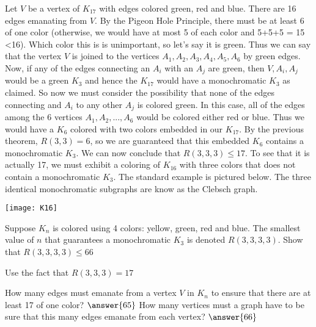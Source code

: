 \documentclass[handout]{ximera}
\begin{document}
\begin{theorem}[$R(3,3,3) = 17$]
Let $V$ be a vertex of $K_{17}$ with edges colored green, red and blue. There are 16 edges emanating from $V$.
By the Pigeon Hole Principle, there must be at least 6 of one color (otherwise, we would have at most 5 of each color
and 5+5+5 = 15 <16).  Which color this is is unimportant, so let's say it is green. Thus we can say that the vertex $V$ is 
joined to the vertices $A_1, A_2, A_3, A_4, A_5, A_6$ by green edges. Now, if any of the edges connecting an $A_i$
with an $A_j$ are green, then $V, A_i, A_j$ would be a green $K_3$ and hence the $K_{17}$ would have a monochromatic 
$K_3$ as claimed. So now we must consider the possibility that none of the edges connecting and $A_i$ to any other $A_j$
is colored green.  In this case, all of the edges among the 6 vertices $A_1, A_2, ..., A_6$ would be 
colored either red or blue.  Thus we would have a $K_6$ colored with two colors embedded in our $K_{17}$.  
By the previous theorem, $R(3,3) = 6$, so we are guaranteed that this embedded $K_6$ contains a monochromatic $K_3$.
We can now conclude that $R(3,3,3) \leq 17$. To see that it is actually 17, we must exhibit a coloring of $K_{16}$ with three 
colors that does not contain  a monochromatic $K_3$.  
The standard example is pictured below. The three identical monochromatic subgraphs are know as the Clebsch graph.

\begin{image}
\texttt{[image: K16]}
\end{image}

\end{theorem}

\begin{problem}
Suppose $K_n$ is colored using 4 colors: yellow, green, red and blue. The smallest value of $n$ that guarantees
a monochromatic $K_3$ is denoted $R(3,3,3,3)$. Show that $R(3,3,3,3) \leq 66$
\begin{hint}
Use the fact that $R(3,3,3) = 17$
\end{hint}
How many edges must emanate from a vertex $V$ in $K_n$ to ensure that there are at least 17 of one color? $\answer{65}$
How many vertices must a graph have to be sure that this many edges emanate from each vertex? $\answer{66}$

\end{problem}
\end{document}
